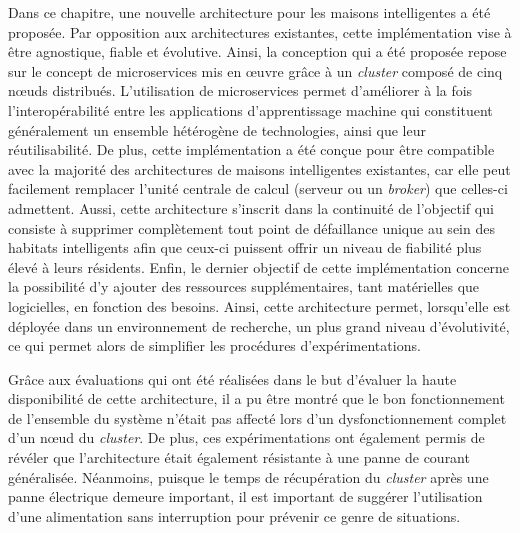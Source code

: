 Dans ce chapitre, une nouvelle architecture pour les maisons intelligentes a été proposée. Par opposition aux architectures existantes, cette implémentation vise à être agnostique, fiable et évolutive. Ainsi, la conception qui a été proposée repose sur le concept de microservices mis en \oe{}uvre grâce à un \textit{cluster} composé de cinq n\oe{}uds distribués. L'utilisation de microservices permet d'améliorer à la fois l'interopérabilité entre les applications d'apprentissage machine qui constituent généralement un ensemble hétérogène de technologies, ainsi que leur réutilisabilité. De plus, cette implémentation a été conçue pour être compatible avec la majorité des architectures de maisons intelligentes existantes, car elle peut facilement remplacer l'unité centrale de calcul (serveur ou un \textit{broker}) que celles-ci admettent. Aussi, cette architecture s'inscrit dans la continuité de l'objectif qui consiste à supprimer complètement tout point de défaillance unique au sein des habitats intelligents afin que ceux-ci puissent offrir un niveau de fiabilité plus élevé à leurs résidents. Enfin, le dernier objectif de cette implémentation concerne la possibilité d'y ajouter des ressources supplémentaires, tant matérielles que logicielles, en fonction des besoins. Ainsi, cette architecture permet, lorsqu'elle est déployée dans un environnement de recherche, un plus grand niveau d'évolutivité, ce qui permet alors de simplifier les procédures d'expérimentations.

Grâce aux évaluations qui ont été réalisées dans le but d'évaluer la haute disponibilité de cette architecture, il a pu être montré que le bon fonctionnement de l'ensemble du système n'était pas affecté lors d'un dysfonctionnement complet d'un n\oe{}ud du \textit{cluster}. De plus, ces expérimentations ont également permis de révéler que l'architecture était également résistante à une panne de courant généralisée. Néanmoins, puisque le temps de récupération du \textit{cluster} après une panne électrique demeure important, il est important de suggérer l'utilisation d'une alimentation sans interruption pour prévenir ce genre de situations.
